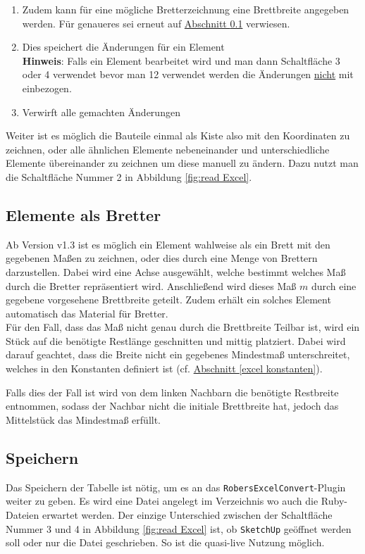 \documentclass{book}
\newcommand{\sketchup}{\texttt{SketchUp}\xspace}
\newcommand{\robersexcelconvert}{\texttt{RobersExcelConvert}\xspace}
\newcommand{\hinweis}[1]{\newline \textbf{Hinweis}: #1 \newline}
\begin{document}
\begin{enumerate}
					\item Zudem kann für eine mögliche Bretterzeichnung eine Brettbreite angegeben werden. Für genaueres sei erneut auf \hyperref[bretter]{Abschnitt \ref{bretter}} verwiesen.
					\item Dies speichert die Änderungen für ein Element\\
						\hinweis{Falls ein Element bearbeitet wird und man dann Schaltfläche 3 oder 4 verwendet bevor man 12 verwendet werden die Änderungen \underline{nicht} mit einbezogen.}
					\item Verwirft alle gemachten Änderungen
				\end{enumerate}
				Weiter ist es möglich die Bauteile einmal als Kiste also mit den Koordinaten zu zeichnen, oder alle ähnlichen Elemente nebeneinander und unterschiedliche Elemente übereinander zu zeichnen um diese manuell zu ändern. Dazu nutzt man die Schaltfläche Nummer 2 in Abbildung \ref{fig:read Excel}.\\
			\subsection{Elemente als Bretter}\label{bretter}
				Ab Version v1.3 ist es möglich ein Element wahlweise als ein Brett mit den gegebenen Maßen zu zeichnen, oder dies durch eine Menge von Brettern darzustellen.
				Dabei wird eine Achse ausgewählt, welche bestimmt welches Maß durch die Bretter repräsentiert wird. Anschließend wird dieses Maß $m$ durch eine gegebene vorgesehene Brettbreite geteilt. Zudem erhält ein solches Element automatisch das Material für Bretter.\\
				
				Für den Fall, dass das Maß nicht genau durch die Brettbreite Teilbar ist, wird ein Stück auf die benötigte Restlänge geschnitten und mittig platziert. Dabei wird darauf geachtet, dass die Breite nicht ein gegebenes Mindestmaß unterschreitet, welches in den Konstanten definiert ist (cf. \hyperref[excel konstanten]{Abschnitt \ref{excel konstanten}}).
				
				Falls dies der Fall ist wird von dem linken Nachbarn die benötigte Restbreite entnommen, sodass der Nachbar nicht die initiale Brettbreite hat, jedoch das Mittelstück das Mindestmaß erfüllt.
			\subsection{Speichern}
				Das Speichern der Tabelle ist nötig, um es an das \robersexcelconvert-Plugin weiter zu geben. Es wird eine Datei angelegt im Verzeichnis wo auch die Ruby-Dateien erwartet werden. Der einzige Unterschied zwischen der Schaltfläche Nummer 3 und 4 in Abbildung \ref{fig:read Excel} ist, ob \sketchup geöffnet werden soll oder nur die Datei geschrieben. So ist die quasi-live Nutzung möglich. 
\end{document}
